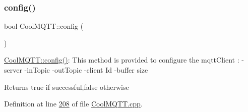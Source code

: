 \subsubsection{\texorpdfstring{config()}{config()}\hspace{0.1cm}{\footnotesize\ttfamily [2/2]}}
{\footnotesize\ttfamily bool Cool\+M\+Q\+T\+T\+::config (\begin{DoxyParamCaption}{ }\end{DoxyParamCaption})}

\hyperlink{class_cool_m_q_t_t_a6571671781a505feca9a8a56e256c6bc}{Cool\+M\+Q\+T\+T\+::config()}\+: This method is provided to configure the mqtt\+Client \+: -\/server -\/in\+Topic -\/out\+Topic -\/client Id -\/buffer size

\begin{DoxyReturn}{Returns}
true if successful,false otherwise 
\end{DoxyReturn}


Definition at line \hyperlink{_cool_m_q_t_t_8cpp_source_l00208}{208} of file \hyperlink{_cool_m_q_t_t_8cpp_source}{Cool\+M\+Q\+T\+T.\+cpp}.


